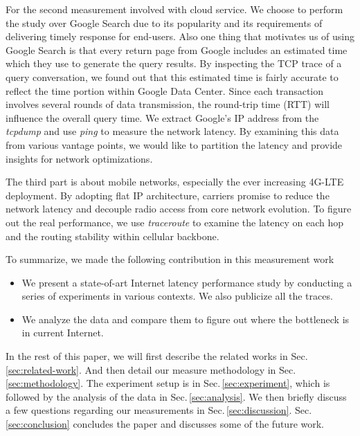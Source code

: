For the second measurement involved with cloud service. We choose to perform the study over Google Search due to its popularity and its requirements of delivering timely response for end-users. Also one thing that motivates us of using Google Search is that every return page from Google includes an estimated time which they use to generate the query results. By inspecting the TCP trace of a query conversation, we found out that this estimated time is fairly accurate to reflect the time portion within Google Data Center. Since each transaction involves several rounds of data transmission, the round-trip time (RTT) will influence the overall query time. We extract Google's IP address from the {\it tcpdump} and use {\it ping} to measure the network latency. By examining this data from various vantage points, we would like to partition the latency and provide insights for network optimizations.

The third part is about mobile networks, especially the ever increasing 4G-LTE deployment. By adopting flat IP architecture, carriers promise to reduce the network latency and decouple radio access from core network evolution. To figure out the real performance, we use {\it traceroute} to examine the latency on each hop and the routing stability within cellular backbone. 

To summarize, we made the following contribution in this measurement work
\begin{itemize}
\item We present a state-of-art Internet latency performance study by conducting a series of experiments in various contexts. We also publicize all the traces.
\item We analyze the data and compare them to figure out where the bottleneck is in current Internet.
\end{itemize}

In the rest of this paper, we will first describe the related works in Sec.\,\ref{sec:related-work}. And then detail our measure methodology in Sec.\,\ref{sec:methodology}. The experiment setup is in Sec.\,\ref{sec:experiment}, which is followed by the analysis of the data in Sec.\,\ref{sec:analysis}. We then briefly discuss a few questions regarding our measurements in Sec.\,\ref{sec:discussion}. Sec.\,\ref{sec:conclusion} concludes the paper and discusses some of the future work.


